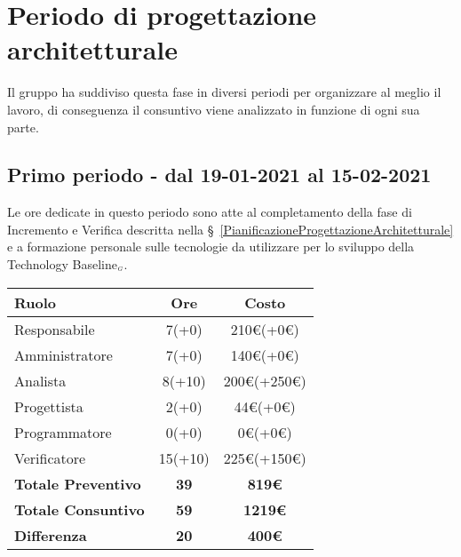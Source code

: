 {{\section{Periodo di progettazione architetturale}\label{ConsuntivoPeriodoDiProgettazioneArchitetturale}

Il gruppo ha suddiviso questa fase in diversi periodi per organizzare al meglio il lavoro, di conseguenza il consuntivo viene analizzato in funzione di ogni sua parte.

\subsection{Primo periodo - dal 19-01-2021 al 15-02-2021}\label{ConsuntivoPeriodoDiProgettazioneArchitetturaleIncrementoEVerifica}

Le ore dedicate in questo periodo sono atte al completamento della fase di Incremento e Verifica descritta nella \S~\ref{PianificazioneProgettazioneArchitetturale} e a formazione personale sulle tecnologie da utilizzare per lo sviluppo della Technology Baseline$_{\scaleto{G}{3pt}}$.

\quad
\def\tabularxcolumn#1{m{#1}}
{
	\begin{center}
		\renewcommand{\arraystretch}{1.4}
		\begin{tabularx}{10cm}{|X|c|c|}
			\hline
			\rowcolor{airforceblue}
			\textbf{Ruolo} & \textbf{Ore} & \textbf{Costo}\\
			\hline
			Responsabile & 7(+0) & 210\euro(+0\euro)\\
			\hline
			Amministratore & 7(+0) & 140\euro(+0\euro)\\
			\hline
			Analista & 8(+10) & 200\euro(+250\euro)\\
			\hline
			Progettista & 2(+0) & 44\euro(+0\euro)\\
			\hline
			Programmatore & 0(+0) & 0\euro(+0\euro)\\
			\hline
			Verificatore & 15(+10) & 225\euro(+150\euro)\\
			\hline
			\textbf{Totale Preventivo} & \textbf{39} & \textbf{819\euro}\\
			\hline
			\textbf{Totale Consuntivo} & \textbf{59} & \textbf{1219\euro}\\
			\hline
			\textbf{Differenza} & \textbf{20} & \textbf{400\euro}
		\end{tabularx}
	\end{center}

}}}
